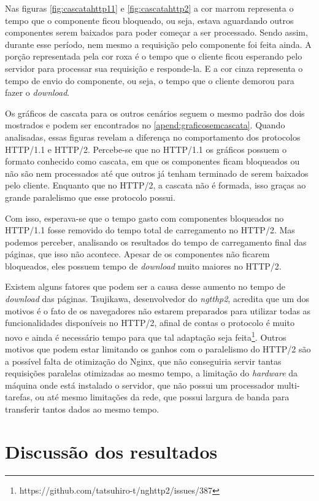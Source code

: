 Nas figuras \ref{fig:cascatahttp11} e \ref{fig:cascatahttp2} a cor marrom representa o tempo que o componente ficou bloqueado, ou seja, estava aguardando outros componentes serem baixados para poder começar a ser processado. Sendo assim, durante esse período, nem mesmo a requisição pelo componente foi feita ainda. A porção representada pela cor roxa é o tempo que o cliente ficou esperando pelo servidor para processar sua requisição e responde-la. E a cor cinza representa o tempo de envio do componente, ou seja, o tempo que o cliente demorou para fazer o \textit{download}.

Os gráficos de cascata para os outros cenários seguem o mesmo padrão dos dois mostrados e podem ser encontrados no \autoref{apend:graficosemcascata}. Quando analisadas, essas figuras revelam a diferença no comportamento dos protocolos HTTP/1.1 e HTTP/2. Percebe-se que no HTTP/1.1 os gráficos possuem o formato conhecido como cascata, em que os componentes ficam bloqueados ou não são nem processados até que outros já tenham terminado de serem baixados pelo cliente. Enquanto que no HTTP/2, a cascata não é formada, isso graças ao grande paralelismo que esse protocolo possui.

Com isso, esperava-se que o tempo gasto com componentes bloqueados no HTTP/1.1 fosse removido do tempo total de carregamento no HTTP/2. Mas podemos perceber, analisando os resultados do tempo de carregamento final das páginas, que isso não acontece. Apesar de os componentes não ficarem bloqueados, eles possuem tempo de \textit{download} muito maiores no HTTP/2.

Existem alguns fatores que podem ser a causa desse aumento no tempo de \textit{download} das páginas. Tsujikawa, desenvolvedor do \textit{ngtthp2}, acredita que um dos motivos é o fato de os navegadores não estarem preparados para utilizar todas as funcionalidades disponíveis no HTTP/2, afinal de contas o protocolo é muito novo e ainda é necessário tempo para que tal adaptação seja feita\footnote{https://github.com/tatsuhiro-t/nghttp2/issues/387}. Outros motivos que podem estar limitando os ganhos com o paralelismo do HTTP/2 são a possível falta de otimização do Nginx, que não conseguiria servir tantas requisições paralelas otimizadas ao mesmo tempo, a limitação do \textit{hardware} da máquina onde está instalado o servidor, que não possui um processador multi-tarefas, ou até mesmo limitações da rede, que possui largura de banda para transferir tantos dados ao mesmo tempo.

\section{Discussão dos resultados}
\label{discussaodosresultados}

